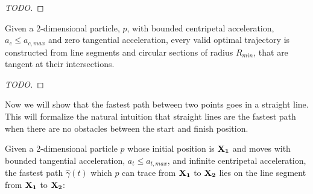 \begin{proof}
[TODO]
\end{proof}

\begin{corollary}\label{corr:optimal-path-fix-s}
Given a 2-dimensional particle, $p$, with bounded centripetal acceleration, $a_c \le a_{c,max}$ and zero tangential acceleration, every valid optimal trajectory is constructed from line segments and circular sections of radius $R_{min}$, that are tangent at their intersections.
\end{corollary}

\begin{proof}
[TODO]
\end{proof}


Now we will show that the fastest path between two points goes in a straight line. This will formalize the natural intuition that straight lines are the fastest path when there are no obstacles between the start and finish position.

\begin{theorem}
  Given a 2-dimensional particle $p$ whose initial position is $\mathbf{X_1}$ and moves with bounded tangential acceleration, $a_t \le a_{t,max}$, and infinite centripetal acceleration, the fastest path $\hat{\gamma}(t)$ which $p$ can trace from $\mathbf{X_1}$ to $\mathbf{X_2}$ lies on the line segment from $\mathbf{X_1}$ to $\mathbf{X_2}$:
\end{theorem}

